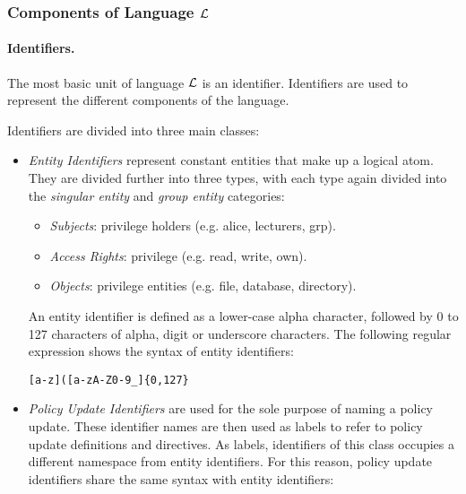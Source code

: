 \documentclass[10pt, twocolumn]{article}
\begin{document}
      \subsubsection{Components of Language $\cal{L}$}

        \paragraph{Identifiers.}
          The most basic unit of language $\cal{L}$ is an identifier.
          Identifiers are used to represent the different components of the
          language.  
    
          Identifiers are divided into three main classes:

          \begin{itemize}
            \item
              {\em Entity Identifiers} represent constant entities that make up
              a logical atom. They are divided further into three types, with
              each type again divided into the {\em singular entity} and
              {\em group entity} categories:

              \begin{itemize}
                \item
                  {\em Subjects}: privilege holders (e.g. alice, lecturers,
                  grp).
                \item
                  {\em Access Rights}: privilege (e.g. read, write, own).
                \item
                  {\em Objects}: privilege entities (e.g. file, database,
                  directory).
              \end{itemize}

              An entity identifier is defined as a lower-case alpha character,
              followed by 0 to 127 characters of alpha, digit or underscore
              characters. The following regular expression shows the syntax
              of entity identifiers:

              \begin{verbatim}[a-z]([a-zA-Z0-9_]{0,127}\end{verbatim}

            \item
              {\em Policy Update Identifiers} are used for the sole purpose of
              naming a policy update. These identifier names are then used as
              labels to refer to policy update definitions and directives. As
              labels, identifiers of this class occupies a different namespace
              from entity identifiers. For this reason, policy update
              identifiers share the same syntax with entity identifiers:


\end{itemize}
\end{document}

